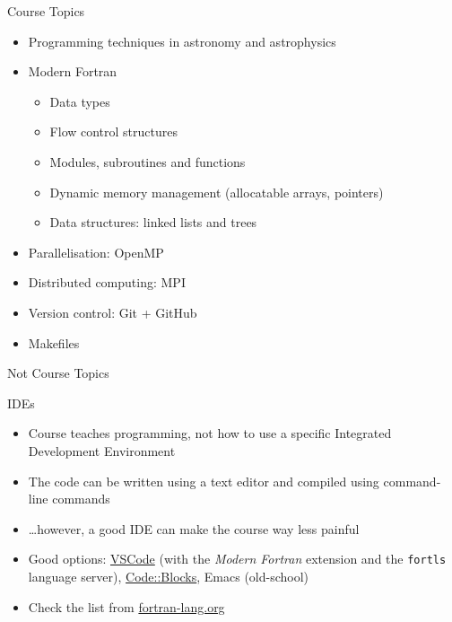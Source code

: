 \begin{frame}{Course Topics}
  \begin{itemize}
  	\item Programming techniques in astronomy and astrophysics
    \item Modern Fortran
      \begin{itemize}
        \item Data types
        \item Flow control structures
        \item Modules, subroutines and functions
        \item Dynamic memory management (allocatable arrays, pointers)
        \item Data structures: linked lists and trees
      \end{itemize}
    \item Parallelisation: OpenMP
    \item Distributed computing: MPI
    \item Version control: Git + GitHub
    \item Makefiles
  \end{itemize}
\end{frame}


\begin{frame}{Not Course Topics}
	\begin{block}{IDEs}
	\begin{itemize}
		\item Course teaches programming, not how to use a specific Integrated Development Environment
		\item The code can be written using a text editor and compiled using command-line commands
		\item \ldots however, a good IDE can make the course way less painful
		\item Good options: \href{https://code.visualstudio.com}{VSCode} (with the \emph{Modern Fortran} extension and the \texttt{fortls} language server), \href{https://www.codeblocks.org/}{Code::Blocks}, Emacs (old-school)
		\item Check the list from \href{https://fortran-lang.org/learn/os_setup/ides/}{fortran-lang.org}
	\end{itemize}
	\end{block}
\end{frame}


